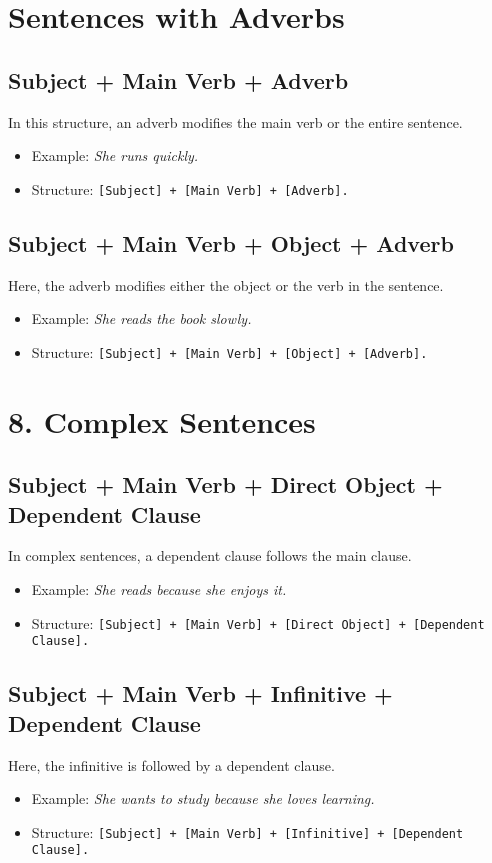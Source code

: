 \documentclass{book}
\begin{document}
\section{Sentences with Adverbs}

\subsection{Subject + Main Verb + Adverb}
In this structure, an adverb modifies the main verb or the entire sentence.
\begin{itemize}
	\item Example: \textit{She runs quickly.}
	\item Structure: \texttt{[Subject] + [Main Verb] + [Adverb].}
\end{itemize}

\subsection{Subject + Main Verb + Object + Adverb}
Here, the adverb modifies either the object or the verb in the sentence.
\begin{itemize}
	\item Example: \textit{She reads the book slowly.}
	\item Structure: \texttt{[Subject] + [Main Verb] + [Object] + [Adverb].}
\end{itemize}

\section{8. Complex Sentences}

\subsection{Subject + Main Verb + Direct Object + Dependent Clause}
In complex sentences, a dependent clause follows the main clause.
\begin{itemize}
	\item Example: \textit{She reads because she enjoys it.}
	\item Structure: \texttt{[Subject] + [Main Verb] + [Direct Object] + [Dependent Clause].}
\end{itemize}

\subsection{Subject + Main Verb + Infinitive + Dependent Clause}
Here, the infinitive is followed by a dependent clause.
\begin{itemize}
	\item Example: \textit{She wants to study because she loves learning.}
	\item Structure: \texttt{[Subject] + [Main Verb] + [Infinitive] + [Dependent Clause].}
\end{itemize}
\end{document}
